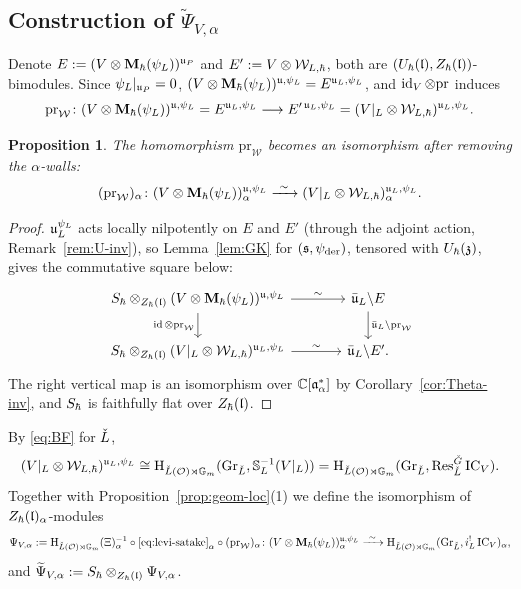 \documentclass{article}
\theoremstyle{plain}
\newtheorem{proposition}[theorem]{Proposition}
\theoremstyle{definition}
\theoremstyle{remark}
\numberwithin{equation}{section}
\begin{document}
\subsection{Construction of \texorpdfstring{$\widetilde\Psi_{V,\alpha}$}{Psi\_alpha}}\label{sec:PsiA}
Denote $E:=(V\otimes\mathbf{M}_\hbar(\psi_L))^{\mathfrak{u}_P}$ and $E':=V\otimes\mathcal{W}_{L,\hbar}$, both are $(U_\hbar(\mathfrak{l}),Z_\hbar(\mathfrak{l}))$-bimodules. Since $\psi_L|_{\mathfrak{u}_P}=0$, $(V\otimes\mathbf{M}_\hbar(\psi_L))^{\mathfrak{u},\psi_L}=E^{\mathfrak{u}_L,\psi_L}$, and $\operatorname{id}_V\otimes\mathrm{pr}$ induces\begin{equation}\label{eq:prV}
\mathrm{pr}_{\mathcal{W}}\colon(V\otimes\mathbf{M}_\hbar(\psi_L))^{\mathfrak{u},\psi_L}=E^{\mathfrak{u}_L,\psi_L}\longrightarrow E'^{\,\mathfrak{u}_L,\psi_L}=(V|_L\otimes\mathcal{W}_{L,\hbar})^{\mathfrak{u}_L,\psi_L}.
\end{equation}

\begin{proposition}\label{prop:prV}
The homomorphism $\mathrm{pr}_{\mathcal{W}}$ becomes an isomorphism after removing the $\alpha$-walls:
\[
(\mathrm{pr}_{\mathcal{W}})_\alpha\colon(V\otimes\bM_\hbar(\psiL))^{\fraku,\psiL}_\alpha\xrightarrow{\ \sim\ }(V|_L\otimes\calW_{L,\hbar})^{\fraku_L,\psiL}_\alpha .
\]
\end{proposition}

\begin{proof}
$\mathfrak{u}_L^{\psi_L}$ acts locally nilpotently on $E$ and $E'$ (through the adjoint action, Remark~\ref{rem:U-inv}), so Lemma~\ref{lem:GK} for $(\mathfrak{s},\psi_{\mathrm{der}})$, tensored with $U_\hbar(\mathfrak{z})$, gives the commutative square below:
\begin{equation}\label{eq:GK-square}
\begin{tikzcd}[column sep=large]
\Sh\otimes_{\Zh(\frakl)}(V\otimes\bM_\hbar(\psiL))^{\fraku,\psiL}\arrow[r,"\sim"]\arrow[d,"\id\otimes\mathrm{pr}_{\mathcal{W}}"'] & \bar\fraku_L\backslash E\arrow[d,"\bar\fraku_L\backslash\mathrm{pr}_{\mathcal{W}}"]\\
\Sh\otimes_{\Zh(\frakl)}(V|_L\otimes\calW_{L,\hbar})^{\fraku_L,\psiL}\arrow[r,"\sim"] & \bar\fraku_L\backslash E' .
\end{tikzcd}
\end{equation}
The right vertical map is an isomorphism over $\mathbb{C}[\mathfrak{a}^*_{\alpha}]$ by Corollary~\ref{cor:Theta-inv}, and $S_\hbar$ is faithfully flat over $Z_\hbar(\mathfrak{l})$.
\end{proof}

By \eqref{eq:BF} for $\check{L}$,
\begin{equation}\label{eq:levi-satake}
(V|_L\otimes\mathcal{W}_{L,\hbar})^{\mathfrak{u}_L,\psi_L}\cong\mathrm{H}_{\check{L}(\mathcal{O})\rtimes\mathbb{G}_m}(\operatorname{Gr}_{\check{L}},\mathbb{S}_L^{-1}(V|_L))=\mathrm{H}_{\check{L}(\mathcal{O})\rtimes\mathbb{G}_m}(\operatorname{Gr}_{\check{L}},\operatorname{Res}^{{\check{G}}}_{\check{L}}\operatorname{IC}_V).
\end{equation}
Together with Proposition~\ref{prop:geom-loc}(1) we define the isomorphism of $Z_\hbar(\mathfrak{l})_\alpha$-modules
\begin{equation}\label{eq:PsiA-def}
\Psi_{V,\alpha}:=\H_{\LO}(\Xi)_\alpha^{-1}\circ\eqref{eq:levi-satake}_\alpha\circ(\mathrm{pr}_{\mathcal{W}})_\alpha\colon(V\otimes\bM_\hbar(\psiL))^{\fraku,\psiL}_\alpha\xrightarrow{\ \sim\ }\H_{\LO}(\GrL,i_L^!\IC_V)_\alpha ,
\end{equation}
and $\widetilde\Psi_{V,\alpha}:=S_\hbar\otimes_{Z_\hbar(\mathfrak{l})}\Psi_{V,\alpha}$.
\end{document}
